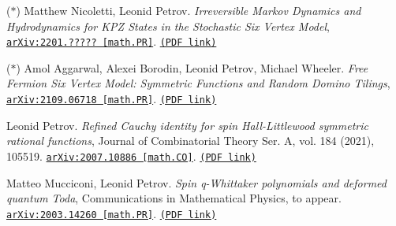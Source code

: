 \begin{etaremune}
\renewcommand{\labelenumi}{[\theenumi]}


\item ($*$)
Matthew Nicoletti, Leonid Petrov.
\emph{Irreversible Markov Dynamics and Hydrodynamics for KPZ States in the Stochastic Six Vertex Model}, 
\href{https://arxiv.org/abs/2201.?????}{\texttt{arXiv:2201.????? [math.PR]}}. \href{https://storage.lpetrov.cc/research_files/Petrov-publ/39-6v.pdf}{\texttt{(PDF link)}}









\item ($*$)
Amol Aggarwal, Alexei Borodin, Leonid Petrov, Michael Wheeler.
\emph{Free Fermion Six Vertex Model: Symmetric Functions and Random Domino Tilings}, 
\href{https://arxiv.org/abs/2109.06718}{\texttt{arXiv:2109.06718 [math.PR]}}. \href{https://storage.lpetrov.cc/research_files/Petrov-publ/38-sl11.pdf}{\texttt{(PDF link)}}

















\item 
Leonid Petrov.
\emph{Refined Cauchy identity for spin Hall-Littlewood symmetric rational functions}, Journal of Combinatorial Theory Ser. A, vol. 184 (2021), 105519. 
\href{https://arxiv.org/abs/2007.10886}{\texttt{arXiv:2007.10886 [math.CO]}}. \href{https://storage.lpetrov.cc/research_files/Petrov-publ/37-publ-petrov-uva.pdf}{\texttt{(PDF link)}}







\item 
Matteo Mucciconi, Leonid Petrov.
\emph{Spin q-Whittaker polynomials and deformed quantum Toda}, Communications in Mathematical Physics, to appear. 
\href{https://arxiv.org/abs/2003.14260}{\texttt{arXiv:2003.14260 [math.PR]}}. \href{https://storage.lpetrov.cc/research_files/Petrov-publ/36-publ-petrov-uva.pdf}{\texttt{(PDF link)}}










\end{etaremune}
